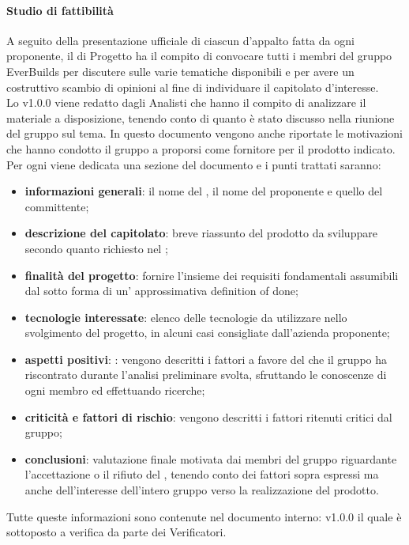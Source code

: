            \paragraph{Studio di fattibilità}
                A seguito della presentazione ufficiale di ciascun  d’appalto fatta da ogni proponente, il  di Progetto ha il compito di convocare tutti i membri del gruppo EverBuilds per discutere sulle varie tematiche disponibili e per avere un costruttivo scambio di opinioni al fine di individuare il capitolato d’interesse. \\
                Lo  v1.0.0 viene redatto dagli Analisti che hanno il compito di analizzare il materiale a disposizione, tenendo conto di quanto è stato discusso nella riunione del gruppo sul tema. In questo documento vengono anche riportate le motivazioni che hanno condotto il gruppo a proporsi come fornitore per il prodotto indicato.\\
                Per ogni  viene dedicata una sezione del documento e i punti trattati saranno:\\
                \begin{itemize}
                    \item\textbf{informazioni generali}: il nome del , il nome del proponente e quello del committente; 
                    \item\textbf{descrizione del capitolato}: breve riassunto del prodotto da sviluppare secondo quanto richiesto nel ; 
                    \item\textbf{finalità del progetto}: fornire l’insieme dei requisiti fondamentali assumibili dal  sotto forma di un’ approssimativa definition of done; 
                    \item\textbf{tecnologie interessate}: elenco delle tecnologie da utilizzare nello svolgimento del progetto, in alcuni casi consigliate dall’azienda proponente; 
                    \item\textbf{aspetti positivi}: : vengono descritti i fattori a favore del  che il gruppo ha riscontrato durante l’analisi preliminare svolta, sfruttando le conoscenze di ogni membro ed effettuando ricerche;
                    \item\textbf{criticità e fattori di rischio}: vengono descritti i fattori ritenuti critici dal gruppo; 
                    \item\textbf{conclusioni}: valutazione finale motivata dai membri del gruppo riguardante l’accettazione o il rifiuto del , tenendo conto dei fattori sopra espressi ma anche dell’interesse dell’intero gruppo verso la realizzazione del prodotto.
                \end{itemize}
                Tutte queste informazioni sono contenute nel documento interno:  v1.0.0 il quale è sottoposto a verifica da parte dei Verificatori.\\
